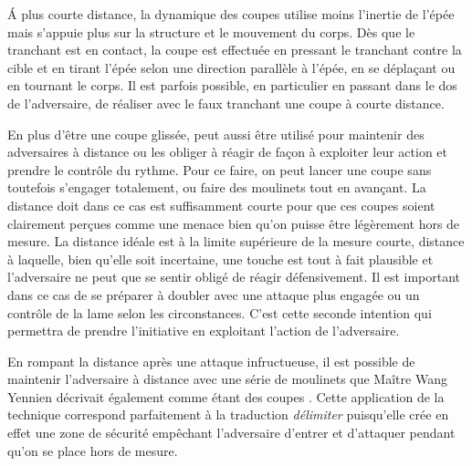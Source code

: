\'{A} plus courte distance, la dynamique des coupes \Hua{} utilise moins l'inertie de l'épée mais s'appuie plus sur la structure et le mouvement du corps. Dès que le tranchant est en contact, la coupe est effectuée en pressant le tranchant contre la cible et en tirant l'épée selon une direction parallèle à l'épée, en se déplaçant ou en tournant le corps. Il est parfois possible, en particulier en passant dans le dos de l'adversaire, de réaliser avec le faux tranchant une coupe \Hua{} à courte distance.

En plus d'être une coupe glissée, \Hua{} peut aussi être utilisé pour maintenir des adversaires à distance ou les obliger à réagir de façon à exploiter leur action et prendre le contrôle du rythme. Pour ce faire, on peut lancer une coupe \Hua{} sans toutefois s'engager totalement, ou faire des moulinets tout en avançant. La distance doit dans ce cas est suffisamment courte pour que ces coupes soient clairement perçues comme une menace bien qu'on puisse être légèrement hors de mesure. La distance idéale est à la limite supérieure de la mesure courte, distance à laquelle, bien qu'elle soit incertaine, une touche est tout à fait plausible et l'adversaire ne peut que se sentir obligé de réagir défensivement. Il est important dans ce cas de se préparer à doubler avec une attaque plus engagée ou un contrôle de la lame selon les circonstances. C'est cette seconde intention qui permettra de prendre l'initiative en exploitant l'action de l'adversaire.

En rompant la distance après une attaque infructueuse, il est possible de maintenir l'adversaire à distance avec une série de moulinets que Maître Wang Yennien décrivait également comme étant des coupes \Hua{}. Cette application de la technique correspond parfaitement à la traduction \textit{délimiter} puisqu'elle crée en effet une zone de sécurité empêchant l'adversaire d'entrer et d'attaquer pendant qu'on se place hors de mesure.
